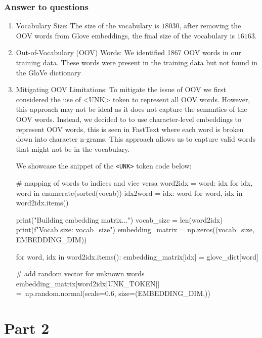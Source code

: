 \documentclass{article}
\newcommand{\code}[1]{\texttt{#1}}
\begin{document}
\subsubsection*{Answer to questions}

\begin{enumerate}
    \item Vocabulary Size: The size of the vocabulary is $18030$, after removing the OOV
          words from Glove embeddings, the final size of the vocabulary is $16163$.

    \item Out-of-Vocabulary (OOV) Words: We identified 1867 OOV words in our training
          data. These words were present in the training data but not found in the GloVe
          dictionary

    \item Mitigating OOV Limitations: To mitigate the issue of OOV we first considered
          the use of <UNK> token to represent all OOV words. However, this approach may
          not be ideal as it does not capture the semantics of the OOV words. Instead, we
          decided to to use character-level embeddings to represent OOV words, this is
          seen in FastText where each word is broken down into character n-grams. This
          approach allows us to capture valid words that might not be in the vocabulary.

          We showcase the snippet of the \code{<UNK>} token code below:

\begin{python}
# mapping of words to indices and vice versa
word2idx = {word: idx for idx, word in enumerate(sorted(vocab))}
idx2word = {idx: word for word, idx in word2idx.items()}

print("Building embedding matrix...")
vocab_size = len(word2idx)
print(f"Vocab size: {vocab_size}")
embedding_matrix = np.zeros((vocab_size, EMBEDDING_DIM))

for word, idx in word2idx.items():
    embedding_matrix[idx] = glove_dict[word]

# add random vector for unknown words
embedding_matrix[word2idx[UNK_TOKEN]] =\
    np.random.normal(scale=0.6, size=(EMBEDDING_DIM,))
\end{python}

\end{enumerate}

\section*{Part 2}
\end{document}
